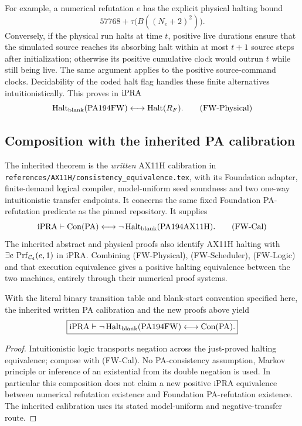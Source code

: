 For example, a numerical refutation $e$ has the explicit physical
halting bound
\[
                 57768+\tau\bigl(B((N_e+2)^2)\bigr).      \tag{FW-Time}
\]
Conversely, if the physical run halts at time $t$, positive live
durations ensure that the simulated source reaches its absorbing halt
within at most $t+1$ source steps after initialization; otherwise its
positive cumulative clock would outrun $t$ while still being live.
The same argument applies to the positive source-command clocks.
Decidability of the coded halt flag handles these finite alternatives
intuitionistically.  This proves in $\mathrm{iPRA}$
\[
 \operatorname{Halt}_{\rm blank}(\mathrm{PA194FW})
 \longleftrightarrow\operatorname{Halt}(R_F).           \tag{FW-Physical}
\]

\subsection{Composition with the inherited PA calibration}

The inherited theorem is the \emph{written} AX11H calibration in
\texttt{references/AX11H/consistency\_equivalence.tex}, with its
Foundation adapter, finite-demand logical compiler, model-uniform seed
soundness and two one-way intuitionistic transfer endpoints.  It
concerns the same fixed Foundation PA-refutation predicate as the pinned
repository.  It supplies
\[
 \mathrm{iPRA}\vdash
 \operatorname{Con}(\mathrm{PA})\longleftrightarrow
 \neg\operatorname{Halt}_{\rm blank}(\mathrm{PA194AX11H}).
                                                               \tag{FW-Cal}
\]
The inherited abstract and physical proofs also identify AX11H halting
with $\exists e\,\operatorname{Prf}_{\mathcal C_4}(e,1)$ in iPRA.
Combining (FW-Physical), (FW-Scheduler), (FW-Logic) and that execution
equivalence gives a positive halting equivalence between the two
machines, entirely through their numerical proof systems.

\begin{fwtheorem}[PA194FW preservation]
With the literal binary transition table and blank-start convention
specified here, the inherited written PA calibration and the new
proofs above yield
\[
 \boxed{\mathrm{iPRA}\vdash
    \neg\operatorname{Halt}_{\rm blank}(\mathrm{PA194FW})
        \longleftrightarrow\operatorname{Con}(\mathrm{PA}).}
\]
\end{fwtheorem}
\begin{proof}
Intuitionistic logic transports negation across the just-proved halting
equivalence; compose with (FW-Cal).  No PA-consistency assumption,
Markov principle or inference of an existential from its double
negation is used.  In particular this composition does not claim a
new positive iPRA equivalence between numerical refutation existence
and Foundation PA-refutation existence.  The inherited calibration
uses its stated model-uniform and negative-transfer route.
\end{proof}

